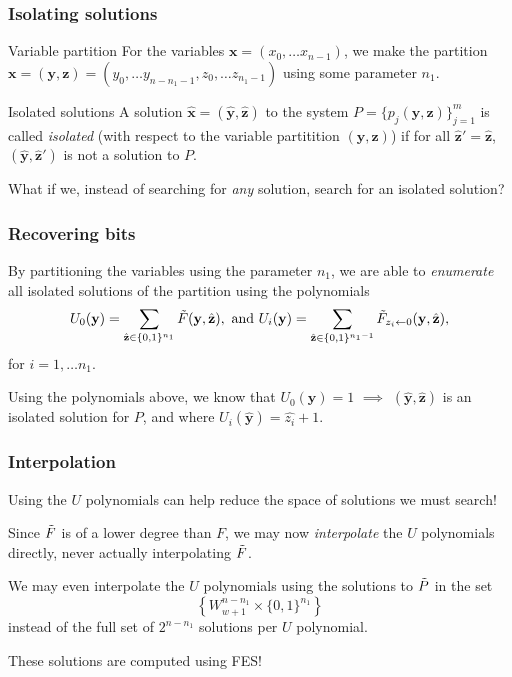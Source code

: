 \documentclass{beamer}
\begin{document}
\begin{frame}
    \frametitle{Isolating solutions}
    \begin{block}{Variable partition}
        For the variables $\mathbf{x} = (x_0, \dots x_{n - 1})$, we make the partition $\mathbf{x} = (\mathbf{y}, \mathbf{z}) = (y_0, \dots y_{n - n_1 - 1}, z_{0}, \dots z_{n_1 - 1})$ using some parameter $n_1$.
    \end{block}

    \begin{alertblock}{Isolated solutions}
        A solution $\hat{\mathbf{x}} = (\hat{\mathbf{y}},\hat{\mathbf{z}})$ to the system $P = \{p_j(\mathbf{y}, \mathbf{z})\}^m_{j = 1}$ is called \textit{isolated} (with respect to the variable partitition $(\mathbf{y}, \mathbf{z})$) if for all $\hat{\mathbf{z}}'=\hat{\mathbf{z}}$, $(\hat{\mathbf{y}}, \hat{\mathbf{z}}')$ is not a solution to $P$.
    \end{alertblock}
    What if we, instead of searching for \textit{any} solution, search for an isolated solution? 
\end{frame}

\begin{frame}
    \frametitle{Recovering bits}
        By partitioning the variables using the parameter $n_1$, we are able to \textit{enumerate} all isolated solutions of the partition using the polynomials
        $$
            U_0(\mathbf{y}) = \sum_{\hat{\mathbf{z}} \in \{0,1\}^{n_1}} \Tilde{F}(\mathbf{y},\hat{\mathbf{z}}), \text{ and } U_i(\mathbf{y}) = \sum_{\hat{\mathbf{z}}\in \{0,1\}^{n_1 - 1}} \Tilde{F}_{z_i \leftarrow 0}(\mathbf{y}, \hat{\mathbf{z}}),
        $$
        for $i = 1, \dots n_1$. \pause

        Using the polynomials above, we know that $U_0(\mathbf{y}) = 1$ $\implies$ $(\hat{\mathbf{y}}, \hat{\mathbf{z}})$ is an isolated solution for $P$, and where $U_i(\hat{\mathbf{y}}) = \hat{z_i} + 1$.
\end{frame}

\begin{frame}
    \frametitle{Interpolation}
    Using the $U$ polynomials can help reduce the space of solutions we must search!

    \pause

    Since $\Tilde{F}$ is of a lower degree than $F$, we may now \textit{interpolate} the $U$ polynomials directly, never actually interpolating $\Tilde{F}$.

    \pause 

    We may even interpolate the $U$ polynomials using the solutions to $\Tilde{P}$ in the set 
    $$
        \left\{ W_{w + 1}^{n - n_1} \times \{0,1\}^{n_1} \right\}
    $$
    instead of the full set of $2^{n - n_1}$ solutions per $U$ polynomial. 
    
    \pause

    These solutions are computed using FES!
\end{frame}
\end{document}
